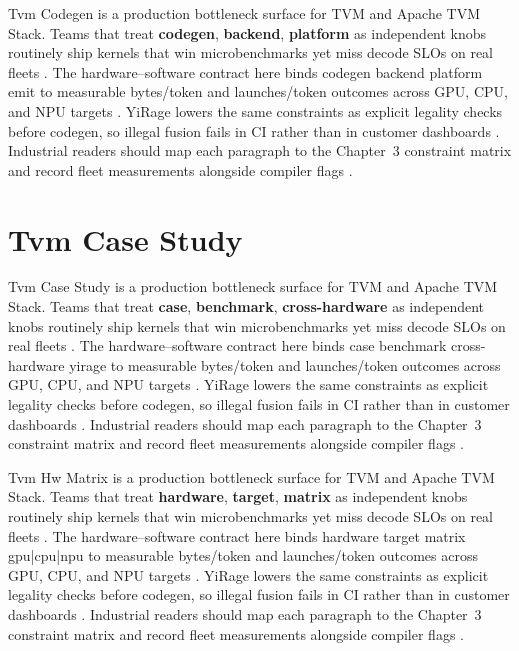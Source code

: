 Tvm Codegen is a production bottleneck surface for TVM and Apache TVM Stack. Teams that treat \textbf{codegen}, \textbf{backend}, \textbf{platform} as independent knobs routinely ship kernels that win microbenchmarks yet miss decode SLOs on real fleets \citep{nvidia2022hopper,amd2024aie}. The hardware--software contract here binds codegen backend platform emit to measurable bytes/token and launches/token outcomes across GPU, CPU, and NPU targets \citep{semianalysis2024tma,dlbook}. YiRage lowers the same constraints as explicit legality checks before codegen, so illegal fusion fails in CI rather than in customer dashboards \citep{amd2024xdna,dao2022flashattention}. Industrial readers should map each paragraph to the Chapter~3 constraint matrix and record fleet measurements alongside compiler flags \citep{amd2024aie,kwon2023vllm}.

\section{Tvm Case Study}
\label{sec:tvm_case_study}

Tvm Case Study is a production bottleneck surface for TVM and Apache TVM Stack. Teams that treat \textbf{case}, \textbf{benchmark}, \textbf{cross-hardware} as independent knobs routinely ship kernels that win microbenchmarks yet miss decode SLOs on real fleets \citep{semianalysis2024tma,dlbook}. The hardware--software contract here binds case benchmark cross-hardware yirage to measurable bytes/token and launches/token outcomes across GPU, CPU, and NPU targets \citep{amd2024xdna,dao2022flashattention}. YiRage lowers the same constraints as explicit legality checks before codegen, so illegal fusion fails in CI rather than in customer dashboards \citep{amd2024aie,kwon2023vllm}. Industrial readers should map each paragraph to the Chapter~3 constraint matrix and record fleet measurements alongside compiler flags \citep{dlbook,nvidia2024cudagraphs}.

Tvm Hw Matrix is a production bottleneck surface for TVM and Apache TVM Stack. Teams that treat \textbf{hardware}, \textbf{target}, \textbf{matrix} as independent knobs routinely ship kernels that win microbenchmarks yet miss decode SLOs on real fleets \citep{memoryfloor2026,amd2024xdna}. The hardware--software contract here binds hardware target matrix gpu|cpu|npu to measurable bytes/token and launches/token outcomes across GPU, CPU, and NPU targets \citep{nvidia2022hopper,amd2024aie}. YiRage lowers the same constraints as explicit legality checks before codegen, so illegal fusion fails in CI rather than in customer dashboards \citep{semianalysis2024tma,dlbook}. Industrial readers should map each paragraph to the Chapter~3 constraint matrix and record fleet measurements alongside compiler flags \citep{amd2024xdna,dao2022flashattention}.

